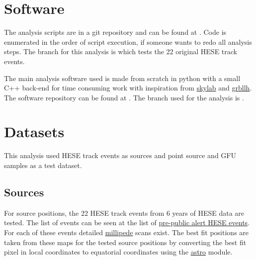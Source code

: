 \section{Software}
The analysis scripts are in a git repository and can be found at .
Code is enumerated in the order of script execution, if someone wants to redo all analysis steps.
The branch for this analysis is  which tests the 22 original HESE track events.

The main analysis software used is made from scratch in python with a small C++ back-end for time consuming work with inspiration from \href{http://code.icecube.wisc.edu/projects/icecube/browser/IceCube/sandbox/skylab}{skylab} and \href{http://code.icecube.wisc.edu/projects/icecube/browser/IceCube/sandbox/richman/grbllh}{grbllh}.
The software repository can be found at .
The branch used for the analysis is .



\section{Datasets}
This analysis used HESE track events as sources and point source and GFU samples as a test dataset.

\subsection{Sources}
For source positions, the 22 HESE track events from 6 years of HESE data are tested.
The list of events can be seen at the list of \href{https://wiki.icecube.wisc.edu/index.php/Analysis_of_pre-public_alert_HESE/EHE_events#HESE }{pre-public alert HESE events}.
For each of these events detailed \href{http://software.icecube.wisc.edu/documentation/projects/millipede/index.html}{millipede} scans exist.
The best fit positions are taken from these maps for the tested source positions by converting the best fit pixel in local coordinates to equatorial coordinates using the \href{http://software.icecube.wisc.edu/documentation/projects/astro/index.html}{astro} module.

